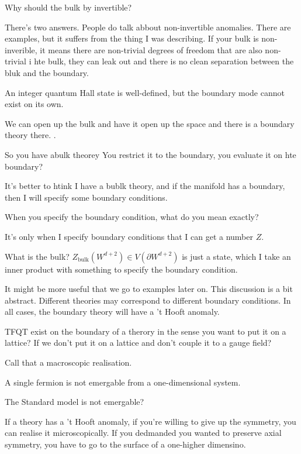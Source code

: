 \begin{question}
    Why should the bulk by invertible?
\end{question}
There's two answers.
People do talk abbout non-invertible anomalies.
There are examples,
but it suffers from the thing I was describing.
If your bulk is non-inverible,
it means there are non-trivial degrees of freedom that are also non-trivial i
hte bulk,
they can leak out and there is no clean separation between the bluk and the
boundary.

An integer quantum Hall state is well-defined,
but the boundary mode cannot exist on its own.

We can open up the bulk and have it open up the space and there is a boundary
theory there.
.
\begin{question}
    So you have abulk theorey
    You restrict it to the boundary,
    you evaluate it on hte boundary?
\end{question}
It's better to htink I have a bublk theory,
and if the manifold has a boundary,
then I will specify some boundary conditions.

\begin{question}
    When you specify the boundary condition,
    what do you mean exactly?
\end{question}
It's only when I specify boundary conditions that I can get a number $Z$.

What is the bulk?
$Z_{\text{bulk}}\left( W^{d+2} \right)\in V(\partial W^{d+2})$
is just a state,
which I take an inner product with something to specify the boundary condition.

It might be more useful that we go to examples later on.
This discussion is a bit abstract.
Different theories may correspond to different boundary conditions.
In all cases, the boundary theory will have a 't Hooft anomaly.

\begin{question}
    TFQT exist on the boundary of a therory in the sense you want to put it on a
    lattice?
    If we don't put it on a lattice and don't couple it to a gauge field?
\end{question}
Call that a macroscopic realisation.

A single fermion is not emergable from a one-dimensional system.

\begin{question}
    The Standard model is not emergable?
\end{question}
If a theory has a 't Hooft anomaly,
if you're willing to give up the symmetry,
you can realise it microscopically.
If you dedmanded you wanted to preserve axial symmetry,
you have to go to the surface of a one-higher dimensino.

